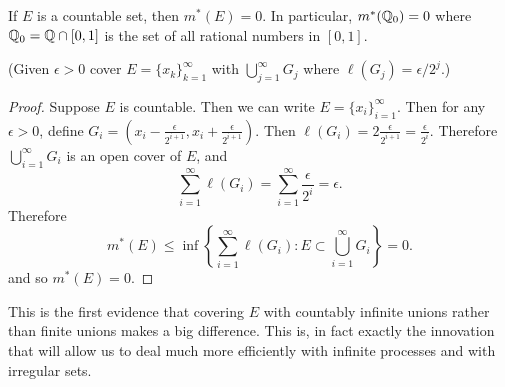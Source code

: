 \begin{pblm}%
	If $E$ is a countable set, then $m^\ast(E) = 0$. In particular, 
	$m^\ast(\mathbb{Q}_0) = 0$ where $\mathbb{Q}_0 = \mathbb{Q} \cap [0,1]$ 
	is the set of all rational numbers in $[0,1]$.

 	(Given $\epsilon > 0$ cover $E = \{x_k\}_{k=1}^\infty$ with 
	$\bigcup\limits_{j=1}^\infty G_j$ where $\ell(G_j) = \epsilon / 2^j$.)
\begin{proof}
	Suppose $E$ is countable. Then we can write $E = \{x_i\}_{i=1}^\infty$. Then 
	for any $\epsilon > 0$, define $G_i = (x_i - \frac{\epsilon}{2^{i+1}}, x_i + \frac{\epsilon}{2^{i+1}})$. 
	Then $\ell(G_i) = 2\frac{\epsilon}{2^{i+1}}=\frac{\epsilon}{2^i}$. 
	Therefore $\bigcup\limits_{i=1}^\infty G_i$ is an open cover of $E$, and 
	\begin{equation*}
		\sum\limits_{i=1}^\infty\ell(G_i) = \sum\limits_{i=1}^\infty\frac{\epsilon}{2^i} = \epsilon. 
	\end{equation*}
	Therefore 
	\begin{equation*}
		m^\ast(E)\le\inf\left\{\sum\limits_{i=1}^\infty\ell(G_i):E\subset\bigcup\limits_{i=1}^\infty G_i\right\} = 0. 
	\end{equation*}
	and so $m^\ast(E) = 0$. 
\end{proof}
\end{pblm}

\begin{rmk}%
	This is the first evidence that covering $E$ with countably infinite 
	unions rather than finite unions makes a big difference. This is, in 
	fact exactly the innovation that will allow us to deal much more 
	efficiently with infinite processes and with irregular sets. 
\end{rmk}

